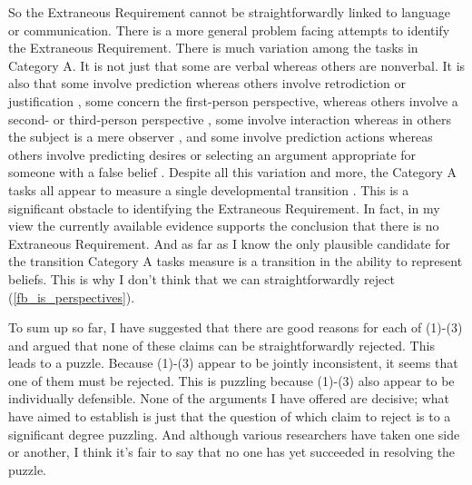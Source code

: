 \documentclass[12pt,\papersize]{extarticle}
\begin{document}
So the Extraneous Requirement cannot be straightforwardly linked to language or communication.
There is a more general problem facing attempts to identify the Extraneous Requirement.
There is much variation among the tasks in Category A.
It is not just that some are verbal whereas others are nonverbal.
It is also that some involve prediction whereas others involve retrodiction or justification \citep[e.g.][]{Wimmer:1998kx},
some concern the first-person perspective, whereas others involve a second- or third-person perspective \citep[e.g.][]{Gopnik:1991db},
some involve interaction whereas in others the subject is a mere observer \citep[e.g.][]{Chandler:1989qa},
and some involve prediction actions whereas others involve predicting desires \citep{Astington:1991kk} or selecting an argument appropriate for someone with a false belief \citep{Bartsch:2000es}.
Despite all this variation and more, the Category A tasks all appear to measure a single developmental transition \citep{Wellman:2001lz}.
This is a significant obstacle to identifying the Extraneous Requirement.
In fact, in my view the currently available evidence supports the conclusion that there is no Extraneous Requirement.
And as far as I know the only plausible candidate for the transition  Category A tasks measure is a transition in the ability to represent beliefs.
This is why I don't think that we can straightforwardly reject  (\ref{fb_is_perspectives}).

To sum up so far, 
I have suggested that there are good reasons for each of (1)-(3) and 
argued that none of these claims can be straightforwardly rejected.
This leads to a puzzle.
Because (1)-(3) appear to be jointly inconsistent, it seems that one of them must be rejected.
This is puzzling because (1)-(3) also appear to be individually defensible.
None of the arguments I have offered are decisive; what have aimed to establish is just that the question of which claim to reject is to a significant degree puzzling.
And although various researchers have taken one side or another,
I think it's fair to say that no one has yet succeeded in resolving the puzzle.
\end{document}

